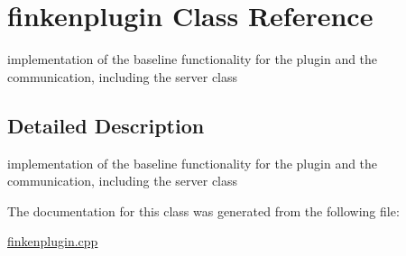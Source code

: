 \hypertarget{classfinkenplugin}{}\section{finkenplugin Class Reference}
\label{classfinkenplugin}


implementation of the baseline functionality for the plugin and the communication, including the server class  




\subsection{Detailed Description}
implementation of the baseline functionality for the plugin and the communication, including the server class 

The documentation for this class was generated from the following file\+:\begin{DoxyCompactItemize}
\item 
\hyperlink{finkenplugin_8cpp}{finkenplugin.\+cpp}\end{DoxyCompactItemize}
